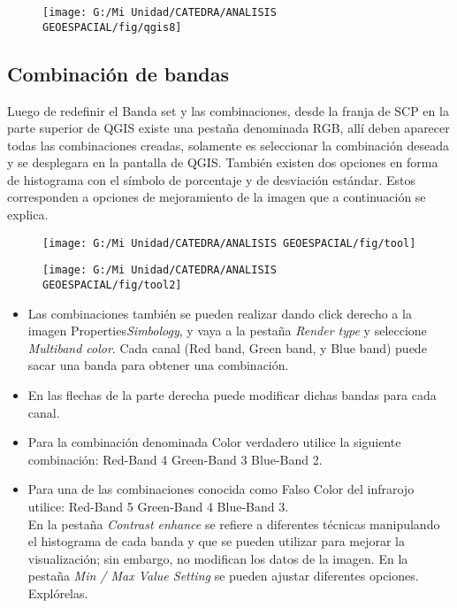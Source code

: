 \documentclass[a4paper,oneside,11pt,]{article}
\begin{document}
\begin{figure}
\centering
\texttt{[image: G:/Mi Unidad/CATEDRA/ANALISIS GEOESPACIAL/fig/qgis8]}
\end{figure}

\subsection{Combinación de bandas}
Luego de redefinir el Banda set y las combinaciones, desde la franja de SCP en la parte superior de QGIS existe una pestaña denominada RGB, allí deben aparecer todas las combinaciones creadas, solamente es seleccionar la combinación deseada y se desplegara en la pantalla de QGIS. También existen dos opciones en forma de histograma con el símbolo de porcentaje y de desviación estándar. Estos corresponden a opciones de mejoramiento de la imagen que a continuación se explica.

\begin{figure}
\centering
\texttt{[image: G:/Mi Unidad/CATEDRA/ANALISIS GEOESPACIAL/fig/tool]}
\end{figure}

\begin{figure}
\centering
\texttt{[image: G:/Mi Unidad/CATEDRA/ANALISIS GEOESPACIAL/fig/tool2]}
\end{figure}

\begin{itemize}
\item Las combinaciones también se pueden realizar dando click derecho a la imagen Properties\textrightarrow \emph{Simbology}, y vaya a la pestaña \emph{Render type} y seleccione \emph{Multiband color}. Cada canal (Red band, Green band, y Blue band) puede sacar una banda para obtener una combinación.
\item En las flechas de la parte derecha puede modificar dichas bandas para cada canal.
\item Para la combinación denominada Color verdadero utilice la siguiente combinación: 
\subitem	Red-Band 4
\subitem	Green-Band 3
\subitem	Blue-Band 2.
\item Para una de las combinaciones conocida como Falso Color del infrarojo utilice: 
\subitem	Red-Band 5
\subitem	Green-Band 4
\subitem	Blue-Band 3.\\
En la pestaña \emph{Contrast enhance} se refiere a diferentes técnicas manipulando el histograma de cada banda y que se pueden utilizar para mejorar la visualización; sin embargo, no modifican los datos de la imagen. En la pestaña \emph{Min / Max Value Setting} se pueden ajustar diferentes opciones. Explórelas.
\end{itemize}
\end{document}

